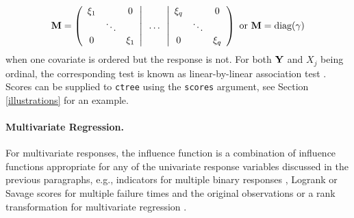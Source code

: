 \documentclass[letter]{article}
\begin{document}
\begin{eqnarray*}
\M = 
\left( 
    \begin{array}{ccc}
        \xi_1 &          & 0     \\
              &  \ddots  &       \\
          0   &          & \xi_1 
    \end{array} \right| 
    \begin{array}{c}
         \\
      \hdots \\
          \\
    \end{array} %
\left|
    \begin{array}{ccc}
        \xi_q &          & 0     \\
              &  \ddots  &       \\
          0   &          & \xi_q 
    \end{array} 
\right) 
\text{ or } %
\M = \text{diag}(\gamma)
\end{eqnarray*}
when one covariate is ordered but the response is not. For both $\mathbf{Y}$ and $X_j$
being ordinal, the corresponding test is known as linear-by-linear association
test \citep{Agresti2002}. Scores can be supplied to \texttt{ctree} using the
\texttt{scores} argument, see Section \ref{illustrations} for an example.

\paragraph{Multivariate Regression.}
For multivariate responses, the influence function is a combination of
influence functions appropriate for any of the univariate response variables
discussed in the previous paragraphs, e.g., indicators for multiple binary
responses \citep{Zhang1998,NohSongPark2004}, Logrank or Savage scores
for multiple failure times 
and the original observations or a rank transformation for multivariate regression 
\citep{Death2002}.
\end{document}
